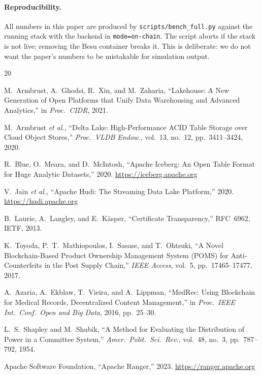 \documentclass[10pt,twocolumn]{article}
\begin{document}
\paragraph{Reproducibility.} All numbers in this paper are produced
by \texttt{scripts/bench\_full.py} against the running stack with
the backend in \texttt{mode=on-chain}. The script aborts if the
stack is not live; removing the Besu container breaks it. This is
deliberate: we do not want the paper's numbers to be mistakable for
simulation output.


\balance
\begin{thebibliography}{20}

M.~Armbrust, A.~Ghodsi, R.~Xin, and M.~Zaharia,
``Lakehouse: A New Generation of Open Platforms that Unify Data
Warehousing and Advanced Analytics,''
in \emph{Proc.\ CIDR}, 2021.

M.~Armbrust \textit{et al.},
``Delta Lake: High-Performance ACID Table Storage over Cloud Object
Stores,''
\emph{Proc.\ VLDB Endow.}, vol.~13, no.~12, pp.~3411--3424, 2020.

R.~Blue, O.~Meara, and D.~McIntosh,
``Apache Iceberg: An Open Table Format for Huge Analytic Datasets,''
2020. \url{https://iceberg.apache.org}

V.~Jain \textit{et al.},
``Apache Hudi: The Streaming Data Lake Platform,'' 2020.
\url{https://hudi.apache.org}

B.~Laurie, A.~Langley, and E.~K\"asper,
``Certificate Transparency,'' RFC~6962, IETF, 2013.

K.~Toyoda, P.~T.~Mathiopoulos, I.~Sasase, and T.~Ohtsuki,
``A Novel Blockchain-Based Product Ownership Management System
(POMS) for Anti-Counterfeits in the Post Supply Chain,''
\emph{IEEE Access}, vol.~5, pp.~17465--17477, 2017.

A.~Azaria, A.~Ekblaw, T.~Vieira, and A.~Lippman,
``MedRec: Using Blockchain for Medical Records, Decentralized
Content Management,''
in \emph{Proc.\ IEEE Int.\ Conf.\ Open and Big Data}, 2016,
pp.~25--30.

L.~S.~Shapley and M.~Shubik,
``A Method for Evaluating the Distribution of Power in a Committee
System,''
\emph{Amer.\ Polit.\ Sci.\ Rev.}, vol.~48, no.~3, pp.~787--792,
1954.

Apache Software Foundation,
``Apache Ranger,'' 2023. \url{https://ranger.apache.org}


\end{thebibliography}
\end{document}
